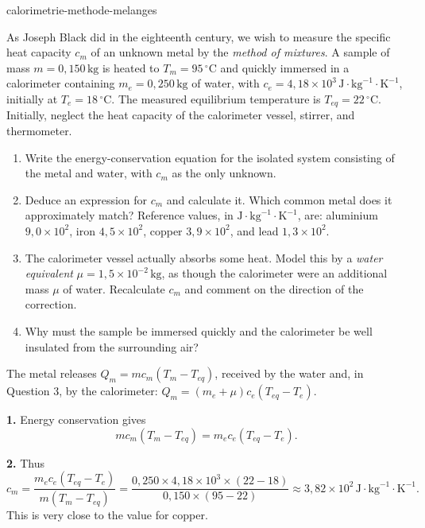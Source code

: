 \begin{exo}{calorimetrie-methode-melanges}

As Joseph Black did in the eighteenth century, we wish to measure the specific heat capacity $c_m$ of an unknown metal by the \emph{method of mixtures}. A sample of mass $m=0{,}150\,\text{kg}$ is heated to $T_m=95\,^\circ\text{C}$ and quickly immersed in a calorimeter containing $m_e=0{,}250\,\text{kg}$ of water, with $c_e=4{,}18\times10^3\,\text{J}\!\cdot\!\text{kg}^{-1}\!\cdot\!\text{K}^{-1}$, initially at $T_e=18\,^\circ\text{C}$. The measured equilibrium temperature is $T_{eq}=22\,^\circ\text{C}$. Initially, neglect the heat capacity of the calorimeter vessel, stirrer, and thermometer.

\begin{enumerate}
  \item Write the energy-conservation equation for the isolated system consisting of the metal and water, with $c_m$ as the only unknown.
  \item Deduce an expression for $c_m$ and calculate it. Which common metal does it approximately match? Reference values, in $\text{J}\!\cdot\!\text{kg}^{-1}\!\cdot\!\text{K}^{-1}$, are: aluminium $9{,}0\times10^2$, iron $4{,}5\times10^2$, copper $3{,}9\times10^2$, and lead $1{,}3\times10^2$.
  \item The calorimeter vessel actually absorbs some heat. Model this by a \emph{water equivalent} $\mu=1{,}5\times10^{-2}\,\text{kg}$, as though the calorimeter were an additional mass $\mu$ of water. Recalculate $c_m$ and comment on the direction of the correction.
  \item Why must the sample be immersed quickly and the calorimeter be well insulated from the surrounding air?
\end{enumerate}

\begin{indication}
The metal releases $Q_m=mc_m(T_m-T_{eq})$, received by the water and, in Question 3, by the calorimeter: $Q_m=(m_e+\mu)c_e(T_{eq}-T_e)$.
\end{indication}

\begin{solution}
\textbf{1.} Energy conservation gives
\[
mc_m(T_m-T_{eq})=m_ec_e(T_{eq}-T_e).
\]

\textbf{2.} Thus
\[
c_m=\frac{m_ec_e(T_{eq}-T_e)}{m(T_m-T_{eq})}
=\frac{0{,}250\times4{,}18\times10^3\times(22-18)}{0{,}150\times(95-22)}
\approx3{,}82\times10^2\,\text{J}\!\cdot\!\text{kg}^{-1}\!\cdot\!\text{K}^{-1}.
\]
This is very close to the value for copper.


\end{solution}
\end{exo}
